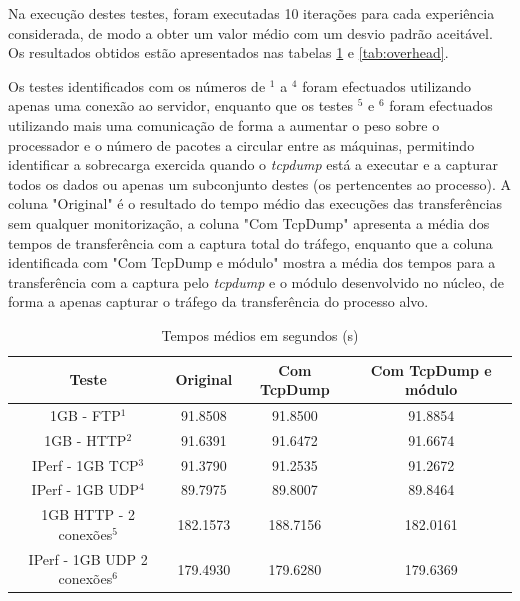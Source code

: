 \documentclass[a4paper]{llncs}
\begin{document}
Na execução destes testes, foram executadas 10 iterações para cada experiência considerada, de modo a obter um valor médio com um desvio padrão aceitável. Os resultados obtidos estão apresentados nas tabelas \ref{tab:desempenho} e \ref{tab:overhead}.

Os testes identificados com os números de $^{1}$ a $^{4}$ foram efectuados utilizando apenas uma conexão ao servidor, enquanto que os testes $^{5}$ e $^{6}$ foram efectuados utilizando mais uma comunicação de forma a aumentar o peso sobre o processador e o número de pacotes a circular entre as máquinas, permitindo identificar a sobrecarga exercida quando o \textit{tcpdump} está a executar e a capturar todos os dados ou apenas um subconjunto destes (os pertencentes ao processo).
 A coluna "Original" é o resultado do tempo médio das execuções das transferências sem qualquer monitorização, a coluna "Com TcpDump" apresenta a média dos tempos de transferência com a captura total do tráfego, enquanto que a coluna identificada com "Com TcpDump e módulo" mostra a média dos tempos para a transferência com a captura pelo \textit{tcpdump} e o módulo desenvolvido no núcleo, de forma a apenas capturar o tráfego da transferência do processo alvo.

\begin{table}
\begin{center}

\begin{tabular}{ | c | c | c | c |  }
\hline
Teste & \hspace {0.3cm} Original \hspace {0.3cm}& \hspace {0.2cm} Com TcpDump \hspace {0.2cm} & Com TcpDump e módulo \\
\hline
1GB - FTP$^{1}$ & 91.8508	& 91.8500 & 91.8854 \\
1GB - HTTP$^{2}$ & 91.6391 & 91.6472 & 91.6674 \\ 
IPerf - 1GB TCP$^{3}$ & 91.3790	& 91.2535	& 91.2672 \\
IPerf - 1GB UDP$^{4}$ & 89.7975 & 89.8007 & 89.8464 \\
\hline
\hline
1GB HTTP - 2 conexões$^{5}$ & 182.1573 & 188.7156 & 182.0161 \\
IPerf - 1GB UDP 2 conexões$^{6}$ & 179.4930 & 179.6280 & 179.6369 \\
\hline
\end{tabular}
\caption{Tempos médios em segundos (s)}
\label{tab:desempenho}
\end{center}
\end{table}
\end{document}
